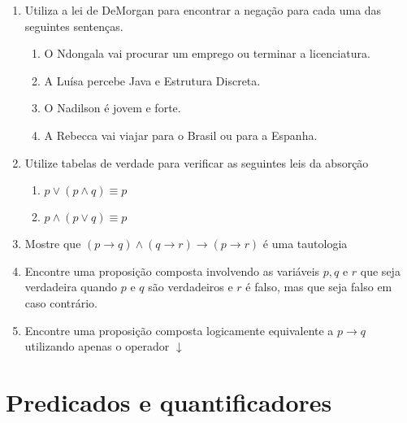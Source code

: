 \begin{enumerate}
	 \item Utiliza a lei de DeMorgan para encontrar a negação para cada uma das seguintes sentenças.
	 \begin{enumerate}
	   	\item O Ndongala vai procurar um emprego ou terminar a licenciatura.
	   	\item A Luísa percebe Java e Estrutura Discreta.
	   	\item O Nadilson é jovem e forte.
	   	\item A Rebecca vai viajar para o Brasil ou para a Espanha.
	 \end{enumerate}
	 \item Utilize tabelas de verdade para verificar as seguintes leis da absorção
	 \begin{enumerate}
	 	\item  $p \lor (p \land q) \equiv p$ \item $p \land (p \lor q) \equiv p$
	\end{enumerate}
	\item Mostre que $(p \to q) \land (q \to r) \to (p \to r)$ é uma tautologia
	\item Encontre uma proposição composta involvendo as variáveis $p, q$ e $r$ que seja verdadeira quando $p$ e $q$ são 
	verdadeiros e $r$ é falso, mas que seja falso em caso contrário.
	\item Encontre uma proposição composta logicamente equivalente a $p \to q$ utilizando apenas o operador $\downarrow$
\end{enumerate}


\section*{Predicados e quantificadores}

